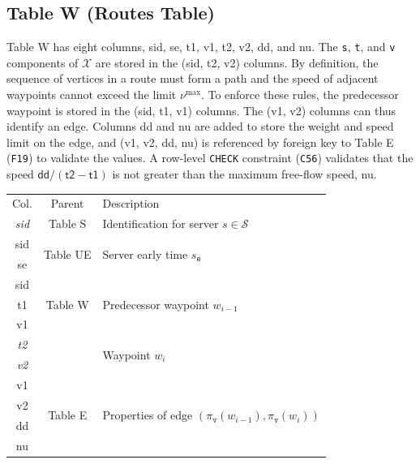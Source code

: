 \subsection{Table W (Routes Table)}
Table W has eight columns, \textsf{sid}, \textsf{se}, \textsf{t1}, \textsf{v1},
\textsf{t2}, \textsf{v2}, \textsf{dd}, and \textsf{nu}.  The \texttt{s},
\texttt{t}, and \texttt{v} components of $\mathcal{X}$ are stored in the
(\textsf{sid}, \textsf{t2}, \textsf{v2}) columns.  By definition, the sequence
of vertices in a route must form a path and the speed of adjacent waypoints
cannot exceed the limit $\nu^\textrm{max}$.  To enforce these rules, the
predecessor waypoint is stored in the (\textsf{sid}, \textsf{t1},
\textsf{v1}) columns.  The (\textsf{v1}, \textsf{v2}) columns can thus identify
an edge. Columns \textsf{dd} and \textsf{nu} are added to store the weight and
speed limit on the edge, and (\textsf{v1}, \textsf{v2}, \textsf{dd},
\textsf{nu}) is referenced by foreign key to Table E ({\tt{}F19}) to validate the
values. A row-level \texttt{CHECK} constraint ({\tt{}C56}) validates that the
speed $\textsf{dd}/(\textsf{t2}-\textsf{t1})$ is not greater than the maximum
free-flow speed, \textsf{nu}.
\begin{table}[h]
\centering
\small
\begin{tabular}{|c|c|l|}
\hline
\rowcolor{TableTitle}
\multicolumn{3}{|c|}{Table W (Routes)} \\
\hline
\rowcolor{TableHeader}
Col. & Parent & Description \\
\hline
\textit{sid} & Table S & Identification for server $s\in\mathcal{S}$ \\
\hline
sid & \multirow{2}{*}{Table UE} & \multirow{2}{*}{Server early time $s_\texttt{e}$} \\
se & & \\
\hline
sid & \multirow{3}{*}{Table W} & \multirow{3}{*}{Predecessor waypoint $w_{i-1}$} \\
t1 & & \\
v1 & & \\
\hline
\textit{t2} & & \multirow{2}{*}{Waypoint $w_i$} \\
\textit{v2} & & \\
\hline
v1 & \multirow{4}{*}{Table E} & \multirow{4}{*}{Properties of edge $(\pi_\texttt{v}(w_{i-1}),\pi_\texttt{v}(w_i))$} \\
v2 & & \\
dd & & \\
nu & & \\
\hline
\end{tabular}
\end{table}
